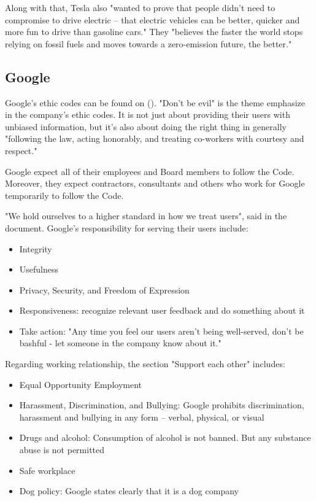 \documentclass[12pt]{article}
\begin{document}
Along with that, Tesla also "wanted to prove that people didn't need to compromise to drive electric – that electric vehicles can be better, quicker and more fun to drive than gasoline cars." They "believes the faster the world stops relying on fossil fuels and moves towards a zero-emission future, the better."

\subsection{Google}

Google's ethic codes can be found on (\cite{go17}). "Don't be evil" is the theme emphasize in the company's ethic codes. It is not just about providing their users with unbiased information, but it's also about doing the right thing in generally "following the law, acting honorably, and treating co-workers with courtesy and respect." 

Google expect all of their employees and Board members to follow the Code. Moreover, they expect contractors, consultants and others who work for Google temporarily to follow the Code.

"We hold ourselves to a higher standard in how we treat users", said in the document. Google's responsibility for serving their users include:

\begin{itemize}
	\item{Integrity}
	\item{Usefulness}
	\item{Privacy, Security, and Freedom of Expression}
	\item{Responsiveness: recognize relevant user feedback and do something about it}
	\item{Take action: "Any time you feel our users aren't being well-served, don't be bashful - let someone in the company know about it."}
\end{itemize}

Regarding working relationship, the section "Support each other" includes:

\begin{itemize}
	\item{Equal Opportunity Employment}
	\item{Harassment, Discrimination, and Bullying: Google prohibits discrimination, harassment and bullying in any form – verbal, physical, or visual}
	\item{Drugs and alcohol: Consumption of alcohol is not banned. But any substance abuse is not permitted}
	\item{Safe workplace}
	\item{Dog policy: Google states clearly that it is a dog company}
\end{itemize}
\end{document}
